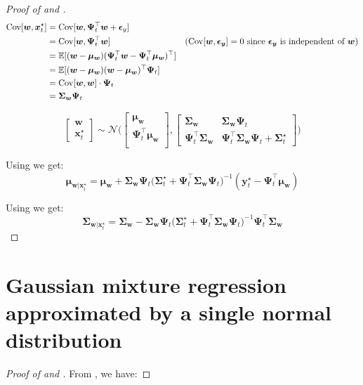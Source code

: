 \documentclass{article}
\begin{document}
\begin{proof}[Proof of  and ]
\begin{align}
  \mathrm{Cov}[\bm{w}, \bm{x}_t^{\star}] &= \mathrm{Cov}[\bm{w}, \bm{\Psi}^\top_t\bm{w} + \bm{\epsilon}_y]\\
                                         &= \mathrm{Cov}[\bm{w}, \bm{\Psi}^\top_t\bm{w}] & ( \mathrm{Cov}[\bm{w}, \bm{\epsilon_y}] = 0 \text{ since } \bm{\epsilon_y} \text{ is independent of } \bm{w})\\
                                         &= \operatorname{\mathbb{E}}[(\bm{w} - \bm{\mu_{w}})(\bm{\Psi}^\top_t\bm{w} - \bm{\Psi}^\top_t\bm{\mu_{w}})^{\top}]\\
                                         &= \operatorname{\mathbb{E}}[(\bm{w} - \bm{\mu_{w}})(\bm{w} - \bm{\mu_{w}})^{\top}\bm{\Psi}_t]\\
                                         &= \mathrm{Cov}[\bm{w}, \bm{w}] \cdot \bm{\Psi}_t\\
                                         &= \bm{\Sigma_{w}} \bm{\Psi}_t
\end{align}

\begin{equation}
  \begin{bmatrix}
    \bm{w} \\
    \bm{x}_t^{\star}
  \end{bmatrix} \sim \mathcal{N}\Bigg(
  \begin{bmatrix}
    \bm{\mu_w} \\
    \bm{\Psi}^\top_t \bm{\mu_w}\\
  \end{bmatrix},
  \begin{bmatrix}
     \bm{\Sigma_w} & \bm{\Sigma_{w}} \bm{\Psi}_t  \\
    \bm{\Psi}^\top_t\bm{\Sigma_w} & \bm{\Psi}^\top_t \bm{\Sigma_w} \bm{\Psi}_t + \bm{\Sigma}^\star_t
  \end{bmatrix}
  \Bigg)
\end{equation}

Using  we get:
\begin{equation}
\bm{\mu}_{\bm{w}|\bm{x}_t^\star} = \bm{\mu_w} + \bm{\Sigma_w}\bm{\Psi}_t \Big(\bm{\Sigma}_t^\star + \bm{\Psi}_t^\top \bm{\Sigma_w}\bm{\Psi}_t \Big)^{-1} (\bm{y}_t^\star - \bm{\Psi}_t^\top \bm{\mu_w})
\end{equation}

Using  we get:
\begin{equation}
\bm{\Sigma}_{\bm{w}|\bm{x}_t^\star} = \bm{\Sigma_w} - \bm{\Sigma_w}\bm{\Psi}_t \Big(\bm{\Sigma}_t^\star +  \bm{\Psi}_t^\top \bm{\Sigma_w}\bm{\Psi}_t \Big)^{-1} \bm{\Psi}_t^\top \bm{\Sigma_w}
\end{equation}
\end{proof}


\section{Gaussian mixture regression approximated by a single normal distribution}
\begin{proof}[Proof of  and ]\label{proof:approx-multimod-to-single}
  From \citep{calinon_tutorial_2016}, we have:
\end{proof}
\end{document}
